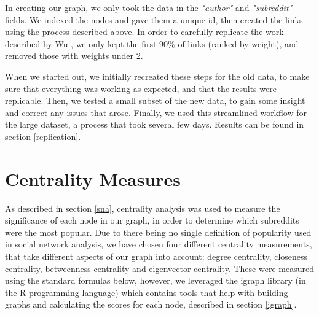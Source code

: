\documentclass[bsc,frontabs,twoside,singlespacing,parskip,deptreport]{infthesis}
\begin{document}
In creating our graph, we only took the data in the \textit{"author"} and  \textit{"subreddit"} fields. We indexed the nodes and gave them a unique id, then created the links using the process described above. In order to carefully replicate the work described by Wu \cite{masters}, we only kept the first 90\% of links (ranked by weight), and removed those with weights under 2.

When we started out, we initially recreated these steps for the old data, to make sure that everything was working as expected, and that the results were replicable. Then, we tested a small subset of the new data, to gain some insight and correct any issues that arose. Finally, we used this streamlined workflow for the large dataset, a process that took several few days. Results can be found in section \ref{replication}.

\section{Centrality Measures}\label{centrality}
As described in section \ref{sna}, centrality analysis was used to measure the significance of each node in our graph, in order to determine which subreddits were the most popular. Due to there being no single definition of popularity used in social network analysis, we have chosen four different centrality measurements, that take different aspects of our graph into account: degree centrality, closeness centrality, betweenness centrality and eigenvector centrality. These were measured using the standard formulas below, however, we leveraged the igraph library (in the R programming language) which contains tools that help with building graphs and calculating the scores for each node, described in section \ref{igraph}.
\end{document}
